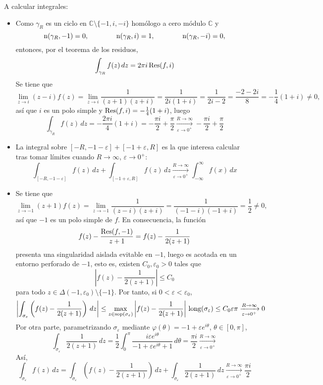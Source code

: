 \documentclass[11pt]{report}
\makeatletter
\renewenvironment{proof}[1][\proofname]{\par
  \pushQED{\qed}%
  \normalfont \topsep\z@skip %
  \trivlist
  \item[\hskip\labelsep
        \itshape
    #1\@addpunct{.}]\ignorespaces
}{%
  \popQED\endtrivlist\@endpefalse
}
\newcommand{\C}{\mathbb C}
\makeatother
\begin{document}
\begin{proof}
\begin{enumerate}
A calcular integrales:
\begin{itemize}
  \item Como $\gamma_R$ es un ciclo en $\C \setminus \{-1,i,-i\}$ homólogo a cero módulo $\C$ y \[\textup{n}(\gamma_R,-1) = 0, \qquad \qquad \textup{n}(\gamma_R,i) = 1, \qquad \qquad \textup{n}(\gamma_R,-i) = 0,\] 
  entonces, por el teorema de los residuos,
  \[\int_{\gamma_R}f(z) \, dz = 2\pi i \, \textup{Res}(f,i)\]
  Se tiene que
  \[\lim_{z \to i} (z-i)f(z)=\lim_{z \to i} \frac{1}{(z+1)(z+i)} = \frac{1}{2i(1+i)} = \frac{1}{2i-2} = \frac{-2-2i}{8} = -\frac{1}{4}(1+i) \neq 0,\]
  así que $i$ es un polo simple y $\textup{Res}(f,i) = -\frac{1}{4}(1+i)$, luego
  \[\int_{\gamma_R}f(z) \, dz = -\frac{2\pi i}{4}(1+i) = -\frac{\pi i}{2}+\frac{\pi}{2}  \xrightarrow[\varepsilon \to 0^+]{R \to \infty} -\frac{\pi i}{2}+\frac{\pi}{2}  \]
  \item La integral sobre $[-R,-1-\varepsilon]+[-1+\varepsilon,R]$ es la que interesa calcular tras tomar límites cuando $R \to \infty$, $\varepsilon \to 0^+$:
  \[\int_{[-R,-1-\varepsilon]} f(z) \, dz + \int_{[-1+\varepsilon,R]} f(z) \, dz  \xrightarrow[\varepsilon \to 0^+]{R \to \infty} \int_{-\infty}^\infty f(x) \, dx \]
  \item Se tiene que
  \[\lim_{z \to -1}(z+1)f(z) = \lim_{z \to -1} \frac{1}{(z-i)(z+i)} = \frac{1}{(-1-i)(-1+i)} = \frac{1}{2} \neq 0,\]
  así que $-1$ es un polo simple de $f$. En consecuencia, la función
  \[f(z)-\frac{\textup{Res}(f,-1)}{z+1} = f(z)-\frac{1}{2(z+1)}\]
  presenta una singularidad aislada evitable en $-1$, luego es acotada en un entorno perforado de $-1$, esto es, existen $C_0,\varepsilon_0>0$ tales que
  \[\left|f(z)-\frac{1}{2(z+1)}\right| \leq C_0\]
  para todo $z \in \Delta(-1,\varepsilon_0) \setminus \{-1\}$. Por tanto, si $0<\varepsilon< \varepsilon_0$,
  \[\left|\int_{\sigma_\varepsilon}\left(f(z)-\frac{1}{2(z+1)}\right) \, dz\right| \leq \max_{z \in \textup{sop}(\sigma_\varepsilon)}\left|f(z)-\frac{1}{2(z+1)}\right| \, \textup{long}(\sigma_\varepsilon) \leq C_0\varepsilon \pi \xrightarrow[\varepsilon \to 0^+]{R \to \infty} 0
  \]
  Por otra parte, parametrizando $\sigma_\varepsilon$ mediante $\varphi(\theta) =-1+ \varepsilon e^{i\theta}$, $\theta \in [0,\pi]$,
  \[\int_{\sigma_\varepsilon} \frac{1}{2(z+1)} \, dz =\frac{1}{2} \int_0^\pi \frac{i\varepsilon e^{i\theta}}{-1+\varepsilon e^{i\theta} +1} \, d\theta =\frac{\pi i}{2} \xrightarrow[\varepsilon \to 0^+]{R \to \infty} \]
  Así,
  \[\int_{\sigma_\varepsilon}f(z) \, dz = \int_{\sigma_\varepsilon} \left(f(z)-\frac{1}{2(z+1)}\right) \, dz + \int_{\sigma_\varepsilon} \frac{1}{2(z+1)} \, dz \xrightarrow[\varepsilon \to 0^+]{R \to \infty} \frac{\pi i }{2}\]

\end{itemize}
\end{enumerate}
\end{proof}
\end{document}
